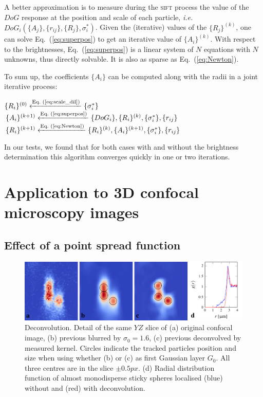 \documentclass[8.5pt,twoside,twocolumn]{article}
\begin{document}
A better approximation is to measure during the \textsc{sift} process the value of the $DoG$ response at the position and scale of each particle, \emph{i.e.} $DoG_i(\lbrace A_j\rbrace, \lbrace r_{ij}\rbrace, \lbrace R_j\rbrace, \sigma_i^*)$. Given the (iterative) values of the $\lbrace R_j\rbrace^{(k)}$, one can solve Eq.~(\ref{eq:superpos}) to get an iterative value of $\lbrace A_i\rbrace^{(k)}$. With respect to the brightnesses, Eq.~(\ref{eq:superpos}) is a linear system of $N$ equations with $N$ unknowns, thus directly solvable. It is also as sparse as Eq.~(\ref{eq:Newton}).

To sum up, the coefficients $\lbrace A_i\rbrace$ can be computed along with the radii in a joint iterative process:
\begin{algorithmic}
\State $\lbrace R_i\rbrace^{(0)} \xleftarrow{\text{Eq.~(\ref{eq:scale_dil})}} \lbrace \sigma_i^*\rbrace$
\Repeat 
	\State $\lbrace A_i\rbrace^{(k+1)} \xleftarrow{\text{Eq.~(\ref{eq:superpos})}} \lbrace DoG_i \rbrace, \lbrace R_i\rbrace^{(k)}, \lbrace \sigma_i^*\rbrace, \lbrace r_{ij}\rbrace$
	\State $\lbrace R_i\rbrace^{(k+1)} \xleftarrow{\text{Eq.~(\ref{eq:Newton})}} \lbrace R_i\rbrace^{(k)}, \lbrace A_i\rbrace^{(k+1)}, \lbrace \sigma_i^*\rbrace, \lbrace r_{ij}\rbrace$ 
\end{algorithmic}

In our tests, we found that for both cases with and without the brightness determination this algorithm converges quickly in one or two iterations.

\section{Application to 3D confocal microscopy images}
\label{sec:confocal}

\subsection{Effect of a point spread function}
\begin{figure}
\centering
\includegraphics{fig_deconv.pdf}
	\caption{Deconvolution. Detail of the same $YZ$ slice of (a) original confocal image, (b) previous blurred by $\sigma_0=1.6$, (c) previous deconvolved by measured kernel. Circles indicate the tracked particles position and size when using whether (b) or (c) as first Gaussian layer $G_0$. All three centres are in the slice $\pm \unit{0.5}{px}$. (d) Radial distribution function of almost monodisperse sticky spheres localised (blue) without and (red) with deconvolution.}
	\label{fig:deconv}
\end{figure}
\end{document}
